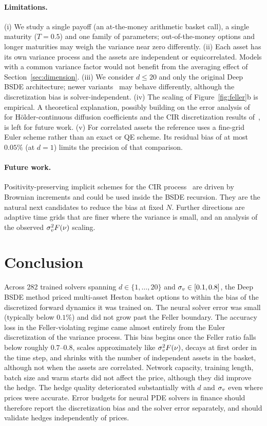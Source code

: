 \paragraph{Limitations.} (i) We study a single payoff (an at-the-money arithmetic basket call), a single maturity ($T=0.5$) and one family of parameters; out-of-the-money options and longer maturities may weigh the variance near zero differently. (ii) Each asset has its own variance process and the assets are independent or equicorrelated. Models with a common variance factor would not benefit from the averaging effect of Section~\ref{sec:dimension}. (iii) We consider $d\le20$ and only the original Deep BSDE architecture; newer variants~\cite{hure2020deep,beck2019machine} may behave differently, although the discretization bias is solver-independent. (iv) The scaling of Figure~\ref{fig:feller}b is empirical. A theoretical explanation, possibly building on the error analysis of~\cite{jiang2021convergence} for H\"older-continuous diffusion coefficients and the CIR discretization results of~\cite{higham2005convergence,alfonsi2005discretization}, is left for future work. (v) For correlated assets the reference uses a fine-grid Euler scheme rather than an exact or QE scheme. Its residual bias of at most $0.05\%$ (at $d=1$) limits the precision of that comparison.

\paragraph{Future work.} Positivity-preserving implicit schemes for the CIR process~\cite{alfonsi2005discretization,alfonsi2010high} are driven by Brownian increments and could be used inside the BSDE recursion. They are the natural next candidates to reduce the bias at fixed $N$. Further directions are adaptive time grids that are finer where the variance is small, and an analysis of the observed $\sigma_v^2 F(\nu)$ scaling.

\section{Conclusion}\label{sec:conclusion}
Across 282 trained solvers spanning $d\in\{1,\dots,20\}$ and $\sigma_v\in[0.1,0.8]$, the Deep BSDE method priced multi-asset Heston basket options to within the bias of the discretized forward dynamics it was trained on. The neural solver error was small (typically below $0.1\%$) and did not grow past the Feller boundary. The accuracy loss in the Feller-violating regime came almost entirely from the Euler discretization of the variance process. This bias begins once the Feller ratio falls below roughly $0.7$--$0.8$, scales approximately like $\sigma_v^2F(\nu)$, decays at first order in the time step, and shrinks with the number of independent assets in the basket, although not when the assets are correlated. Network capacity, training length, batch size and warm starts did not affect the price, although they did improve the hedge. The hedge quality deteriorated substantially with $d$ and $\sigma_v$ even where prices were accurate. Error budgets for neural PDE solvers in finance should therefore report the discretization bias and the solver error separately, and should validate hedges independently of prices.


